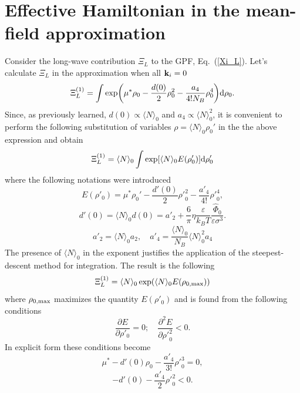 \section{Effective Hamiltonian in the mean-field approximation}
Consider the long-wave contribution $\Xi_L$ to the GPF, Eq.~(\ref{Xi_L}). Let's calculate $\Xi_L$ in the approximation when all $\vb k_i=0$
\begin{equation}
	\Xi_L^{(1)} = \int \exp(\mu^*\rho_0 -\frac{d(0)}{2} \rho_0^2 - \frac{a_4}{4!N_B} \rho_0^4) {\rm d} \rho_0.
\end{equation}
Since, as previously learned, $d(0) \propto \langle N \rangle_0$ and $a_4 \propto \langle N \rangle_0^2$, it is convenient to perform the following substitution of variables $\rho = \langle N \rangle_0 \rho_0'$ in the the above expression and obtain
\begin{equation}
	\Xi_L^{(1)} = \langle N \rangle_0 \int \exp[\langle N \rangle_0 E(\rho'_0)] {\rm d} \rho'_0
\end{equation}
where the following notations were introduced
\begin{equation}
	E(\rho'_0) = \mu^*\rho_0' - \frac{d'(0)}{2} {\rho'}_0^2 - \frac{a'_4}{4!}{\rho'}_0^4,
\end{equation}
\begin{equation}
	d'(0) = \langle N \rangle_0 d(0) = a'_2 + \frac{6}{\pi}\eta \frac{\varepsilon}{k_BT} \frac{\hat{\Phi}_0}{\varepsilon\sigma^3}.
\end{equation}
\begin{equation}
	a'_2 = \langle N \rangle_0 a_2, \quad a'_4 = \frac{\langle N \rangle_0}{N_B} \langle N \rangle_0^2 a_4
\end{equation}
The presence of $\langle N \rangle_0$ in the exponent justifies the application of the steepest-descent method for integration. The result is the following
\begin{equation}
	\label{mf:Xi_L_1}
	\Xi_L^{(1)} = \langle N \rangle_0 \exp(\langle N \rangle_0 E(\rho_{0,{\rm max}}))
\end{equation}
where $\rho_{0,{\rm max}}$ maximizes the quantity $E(\rho'_0)$ and is found from the following conditions
\begin{equation}
	\frac{\partial E}{\partial \rho'_0} = 0; \quad \frac{\partial^2 E}{\partial {\rho'}_0^2} < 0.
\end{equation}
In explicit form these conditions become
\begin{equation}
	\label{eq_rho_mean_field}
	\mu^*-d'(0)\rho_0 - \frac{a'_4}{3!}{\rho'}_0^3 = 0,
\end{equation}
\begin{equation}
	-d'(0) - \frac{a'_4}{2}{\rho'}_0^2 < 0.
\end{equation}

